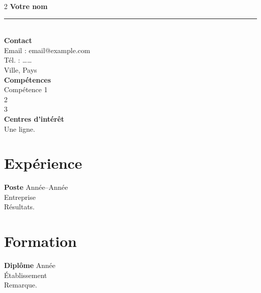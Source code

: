 \documentclass[11pt,a4paper]{article}
\begin{document}
\begin{paracol}{2}
\setlength{\parindent}{0pt}
{\large \textbf{Votre nom}}\\[0.2em]
\rule{\linewidth}{2.2cm}\\[0.5em]
\textbf{Contact}\\
Email : email@example.com\\
Tél. : ……\\
Ville, Pays\\[0.6em]
\textbf{Compétences}\\
Compétence 1\\ 2\\ 3\\[0.6em]
\textbf{Centres d'intérêt}\\
Une ligne.

\switchcolumn
\section*{Expérience}
\textbf{Poste} \hfill Année--Année \\
Entreprise \\
Résultats.

\section*{Formation}
\textbf{Diplôme} \hfill Année \\
Établissement \\
Remarque.
\end{paracol}
\end{document}
